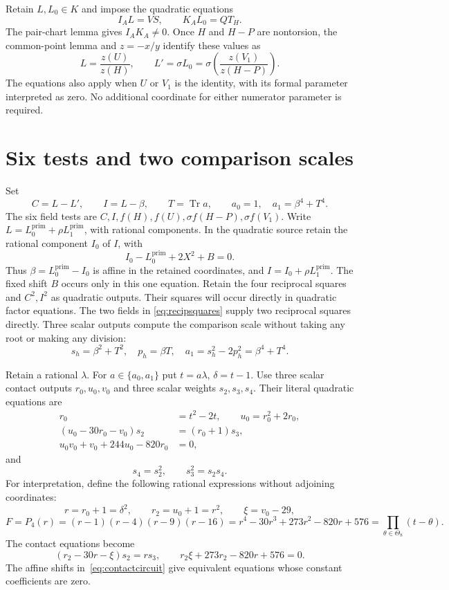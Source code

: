 \documentclass[11pt,a4paper]{article}
\DeclareMathOperator{\Tr}{Tr}\DeclareMathOperator{\Nm}{N}
\begin{document}
Retain $L,L_0\in K$ and impose the quadratic equations
\begin{equation}\label{eq:ratios}
                         I_AL=VS,\qquad K_AL_0=QT_H.
\end{equation}
The pair-chart lemma gives $I_AK_A\ne0$. Once $H$ and $H-P$ are
nontorsion, the common-point lemma and $z=-x/y$ identify these values as
\[
 L=\frac{z(U)}{z(H)},\qquad
 L'=\sigma L_0=\sigma\!\left(\frac{z(V_1)}{z(H-P)}\right).
\]
The equations also apply when $U$ or $V_1$ is the identity, with its
formal parameter interpreted as zero. No additional coordinate for
either numerator parameter is required.

\section{Six tests and two comparison scales}

Set
\[
 C=L-L',\qquad I=L-\beta,\qquad T=\Tr a,
 \qquad a_0=1,\quad a_1=\beta^4+T^4.
\]
The six field tests are $C,I,f(H),f(U),\sigma f(H-P),\sigma f(V_1)$.
Write $L=L_0^{\mathrm{prim}}+\rho L_1^{\mathrm{prim}}$, with rational components.
In the quadratic source retain the rational component $I_0$ of $I$, with
\[
                  I_0-L_0^{\mathrm{prim}}+2X^2+B=0.
\]
Thus $\beta=L_0^{\mathrm{prim}}-I_0$ is affine in the retained
coordinates, and $I=I_0+\rho L_1^{\mathrm{prim}}$.
The fixed shift $B$ occurs only in this one equation.
Retain the four reciprocal squares and $C^2,I^2$ as quadratic outputs.
Their squares will occur directly in quadratic factor equations. The two fields in
\eqref{eq:recipsquares} supply two reciprocal squares directly.
Three scalar outputs compute the comparison scale without taking any
root or making any division:
\[
 s_h=\beta^2+T^2,\quad p_h=\beta T,\quad
 a_1=s_h^2-2p_h^2=\beta^4+T^4.
\]

Retain a rational $\lambda$. For $a\in\{a_0,a_1\}$ put $t=a\lambda$,
$\delta=t-1$. Use three scalar contact outputs $r_0,u_0,v_0$ and
three scalar weights $s_2,s_3,s_4$. Their literal quadratic equations are
\begin{equation}\label{eq:contactcircuit}
\begin{split}
 r_0&=t^2-2t,\qquad u_0=r_0^2+2r_0,\\
 (u_0-30r_0-v_0)s_2&=(r_0+1)s_3,\\
 u_0v_0+v_0+244u_0-820r_0&=0,
\end{split}
\end{equation}
and
\begin{equation}\label{eq:reciprocalweights}
                         s_4=s_2^2,\qquad s_3^2=s_2s_4.
\end{equation}
For interpretation, define the following rational expressions without
adjoining coordinates:
\[
 r=r_0+1=\delta^2,\qquad r_2=u_0+1=r^2,\qquad \xi=v_0-29,
\]
\[
 F=P_4(r)=(r-1)(r-4)(r-9)(r-16)
          =r^4-30r^3+273r^2-820r+576
          =\prod_{\theta\in\Theta_8}(t-\theta).
\]
The contact equations become
\begin{equation}\label{eq:unshiftedcontact}
 (r_2-30r-\xi)s_2=rs_3,\qquad r_2\xi+273r_2-820r+576=0.
\end{equation}
The affine shifts in~\eqref{eq:contactcircuit} give equivalent equations
whose constant coefficients are zero.
\end{document}

